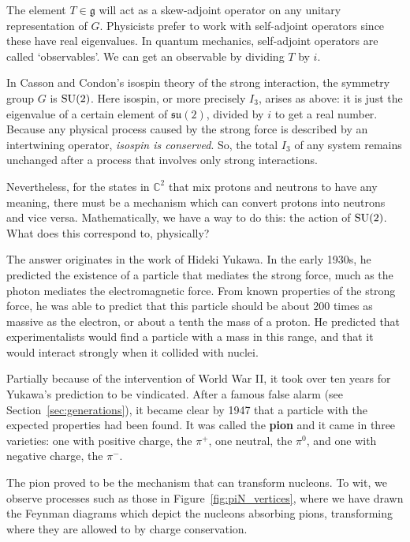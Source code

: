 \documentclass[12pt]{article}
\newcommand{\C}{{\mathbb C}}  %
\newcommand{\SU}{{\rm SU}}    %
\newcommand{\su}{{\mathfrak{su}}}  %
\newcommand{\g}{{\mathfrak{g}}}  %
\begin{document}
The element $T \in \g$ will act as a skew-adjoint operator on any
unitary representation of $G$.  Physicists prefer to work with 
self-adjoint operators since these have real eigenvalues.  
In quantum mechanics, self-adjoint operators are called `observables'.  
We can get an observable by dividing $T$ by $i$.  

In Casson and Condon's isospin theory of the strong interaction, the symmetry
group $G$ is $\SU(2)$.  Here isospin, or more precisely $I_3$, arises
as above: it is just the eigenvalue of a certain element of $\su(2)$,
divided by $i$ to get a real number.  Because any physical process 
caused by the strong force is described by an intertwining operator, 
\emph{isospin is conserved}.  So, the total $I_3$ of any system 
remains unchanged after a process that involves only strong interactions.

Nevertheless, for the states in $\C^2$ that mix protons and neutrons to have
any meaning, there must be a mechanism which can convert protons into neutrons
and vice versa. Mathematically, we have a way to do this: the action of
$\SU(2)$.  What does this correspond to, physically?

The answer originates in the work of Hideki Yukawa. In the early 1930s, he
predicted the existence of a particle that mediates the strong force,
much as the photon mediates the electromagnetic force.  From known 
properties of the strong force, he was able to predict that this particle
should be about 200 times as massive as the electron,
or about a tenth the mass of a proton. He predicted that experimentalists would
find a particle with a mass in this range, and that it would interact strongly
when it collided with nuclei.

Partially because of the intervention of World War II, it took over
ten years for Yukawa's prediction to be vindicated.  After a 
famous false alarm (see Section~\ref{sec:generations}), 
it became clear by 1947 that a particle with the
expected properties had been found. It was called the \textbf{pion} and
it came in three varieties: one with positive charge, the $\pi^+$, one
neutral, the $\pi^0$, and one with negative charge, the $\pi^-$.

The pion proved to be the mechanism that can transform nucleons. To wit, we
observe processes such as those in Figure~\ref{fig:piN_vertices}, where we have
drawn the Feynman diagrams which depict the nucleons absorbing pions,
transforming where they are allowed to by charge conservation.
\end{document}
